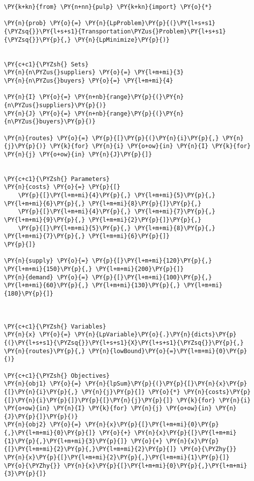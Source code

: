     \begin{tcolorbox}[breakable, size=fbox, boxrule=1pt, pad at break*=1mm,colback=cellbackground, colframe=cellborder]
\begin{Verbatim}[commandchars=\\\{\}]
\PY{k+kn}{from} \PY{n+nn}{pulp} \PY{k+kn}{import} \PY{o}{*}

\PY{n}{prob} \PY{o}{=} \PY{n}{LpProblem}\PY{p}{(}\PY{l+s+s1}{\PYZsq{}}\PY{l+s+s1}{Transportation\PYZus{}Problem}\PY{l+s+s1}{\PYZsq{}}\PY{p}{,} \PY{n}{LpMinimize}\PY{p}{)}


\PY{c+c1}{\PYZsh{} Sets}
\PY{n}{n\PYZus{}suppliers} \PY{o}{=} \PY{l+m+mi}{3}
\PY{n}{n\PYZus{}buyers} \PY{o}{=} \PY{l+m+mi}{4}

\PY{n}{I} \PY{o}{=} \PY{n+nb}{range}\PY{p}{(}\PY{n}{n\PYZus{}suppliers}\PY{p}{)}
\PY{n}{J} \PY{o}{=} \PY{n+nb}{range}\PY{p}{(}\PY{n}{n\PYZus{}buyers}\PY{p}{)}

\PY{n}{routes} \PY{o}{=} \PY{p}{[}\PY{p}{(}\PY{n}{i}\PY{p}{,} \PY{n}{j}\PY{p}{)} \PY{k}{for} \PY{n}{i} \PY{o+ow}{in} \PY{n}{I} \PY{k}{for} \PY{n}{j} \PY{o+ow}{in} \PY{n}{J}\PY{p}{]}


\PY{c+c1}{\PYZsh{} Parameters}
\PY{n}{costs} \PY{o}{=} \PY{p}{[}
    \PY{p}{[}\PY{l+m+mi}{4}\PY{p}{,} \PY{l+m+mi}{5}\PY{p}{,} \PY{l+m+mi}{6}\PY{p}{,} \PY{l+m+mi}{8}\PY{p}{]}\PY{p}{,}
    \PY{p}{[}\PY{l+m+mi}{4}\PY{p}{,} \PY{l+m+mi}{7}\PY{p}{,} \PY{l+m+mi}{9}\PY{p}{,} \PY{l+m+mi}{2}\PY{p}{]}\PY{p}{,} 
    \PY{p}{[}\PY{l+m+mi}{5}\PY{p}{,} \PY{l+m+mi}{8}\PY{p}{,} \PY{l+m+mi}{7}\PY{p}{,} \PY{l+m+mi}{6}\PY{p}{]}
\PY{p}{]}

\PY{n}{supply} \PY{o}{=} \PY{p}{[}\PY{l+m+mi}{120}\PY{p}{,} \PY{l+m+mi}{150}\PY{p}{,} \PY{l+m+mi}{200}\PY{p}{]}
\PY{n}{demand} \PY{o}{=} \PY{p}{[}\PY{l+m+mi}{100}\PY{p}{,} \PY{l+m+mi}{60}\PY{p}{,} \PY{l+m+mi}{130}\PY{p}{,} \PY{l+m+mi}{180}\PY{p}{]}



\PY{c+c1}{\PYZsh{} Variables}
\PY{n}{x} \PY{o}{=} \PY{n}{LpVariable}\PY{o}{.}\PY{n}{dicts}\PY{p}{(}\PY{l+s+s1}{\PYZsq{}}\PY{l+s+s1}{X}\PY{l+s+s1}{\PYZsq{}}\PY{p}{,} \PY{n}{routes}\PY{p}{,} \PY{n}{lowBound}\PY{o}{=}\PY{l+m+mi}{0}\PY{p}{)}

\PY{c+c1}{\PYZsh{} Objectives}
\PY{n}{obj1} \PY{o}{=} \PY{n}{lpSum}\PY{p}{(}\PY{p}{[}\PY{n}{x}\PY{p}{[}\PY{n}{i}\PY{p}{,} \PY{n}{j}\PY{p}{]} \PY{o}{*} \PY{n}{costs}\PY{p}{[}\PY{n}{i}\PY{p}{]}\PY{p}{[}\PY{n}{j}\PY{p}{]} \PY{k}{for} \PY{n}{i} \PY{o+ow}{in} \PY{n}{I} \PY{k}{for} \PY{n}{j} \PY{o+ow}{in} \PY{n}{J}\PY{p}{]}\PY{p}{)}
\PY{n}{obj2} \PY{o}{=} \PY{n}{x}\PY{p}{[}\PY{l+m+mi}{0}\PY{p}{,}\PY{l+m+mi}{0}\PY{p}{]} \PY{o}{+} \PY{n}{x}\PY{p}{[}\PY{l+m+mi}{1}\PY{p}{,}\PY{l+m+mi}{3}\PY{p}{]} \PY{o}{+} \PY{n}{x}\PY{p}{[}\PY{l+m+mi}{2}\PY{p}{,}\PY{l+m+mi}{2}\PY{p}{]} \PY{o}{\PYZhy{}} \PY{n}{x}\PY{p}{[}\PY{l+m+mi}{2}\PY{p}{,}\PY{l+m+mi}{1}\PY{p}{]} \PY{o}{\PYZhy{}} \PY{n}{x}\PY{p}{[}\PY{l+m+mi}{0}\PY{p}{,}\PY{l+m+mi}{3}\PY{p}{]}


\end{Verbatim}
\end{tcolorbox}
